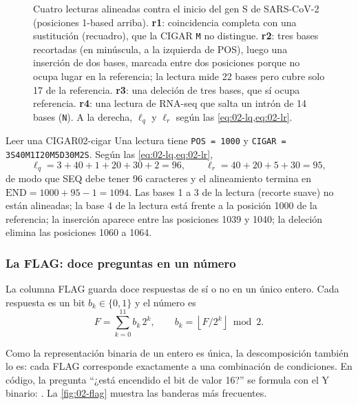 \begin{figure}[t]
\centering

\caption[Cuatro CIGAR sobre la referencia]{Cuatro lecturas alineadas contra el inicio del gen S de SARS-CoV-2 (posiciones 1-based arriba). \textbf{r1}: coincidencia completa con una sustitución (recuadro), que la CIGAR \texttt{M} no distingue. \textbf{r2}: tres bases recortadas (en minúscula, a la izquierda de POS), luego una inserción de dos bases, marcada entre dos posiciones porque no ocupa lugar en la referencia; la lectura mide 22 bases pero cubre solo 17 de la referencia. \textbf{r3}: una deleción de tres bases, que sí ocupa referencia. \textbf{r4}: una lectura de RNA-seq que salta un intrón de 14 bases (\texttt{N}). A la derecha, $\ell_q$ y $\ell_r$ según las \cref{eq:02-lq,eq:02-lr}.}
\label{fig:02-cigar}
\end{figure}

\begin{ejemplo}{Leer una CIGAR}{02-cigar}
Una lectura tiene \texttt{POS = 1000} y \texttt{CIGAR = 3S40M1I20M5D30M2S}. Según las \cref{eq:02-lq,eq:02-lr},
\[
\ell_q = 3+40+1+20+30+2 = 96,\qquad \ell_r = 40+20+5+30 = 95,
\]
de modo que SEQ debe tener 96 caracteres y el alineamiento termina en $\mathrm{END}=1000+95-1=1094$. Las bases 1 a 3 de la lectura (recorte suave) no están alineadas; la base 4 de la lectura está frente a la posición 1000 de la referencia; la inserción aparece entre las posiciones 1039 y 1040; la deleción elimina las posiciones 1060 a 1064.
\end{ejemplo}



\subsubsection{La FLAG: doce preguntas en un número}

La columna FLAG guarda doce respuestas de sí o no en un único entero. Cada respuesta es un bit $b_k\in\{0,1\}$ y el número es
\begin{equation}\label{eq:02-flag}
F = \sum_{k=0}^{11} b_k\, 2^k, \qquad b_k = \left\lfloor F / 2^k \right\rfloor \bmod 2.
\end{equation}
\begin{simbolos}
\end{simbolos}
Como la representación binaria de un entero es única, la descomposición también lo es: cada FLAG corresponde exactamente a una combinación de condiciones. En código, la pregunta ``¿está encendido el bit de valor 16?'' se formula con el Y binario: . La \cref{fig:02-flag} muestra las banderas más frecuentes.

